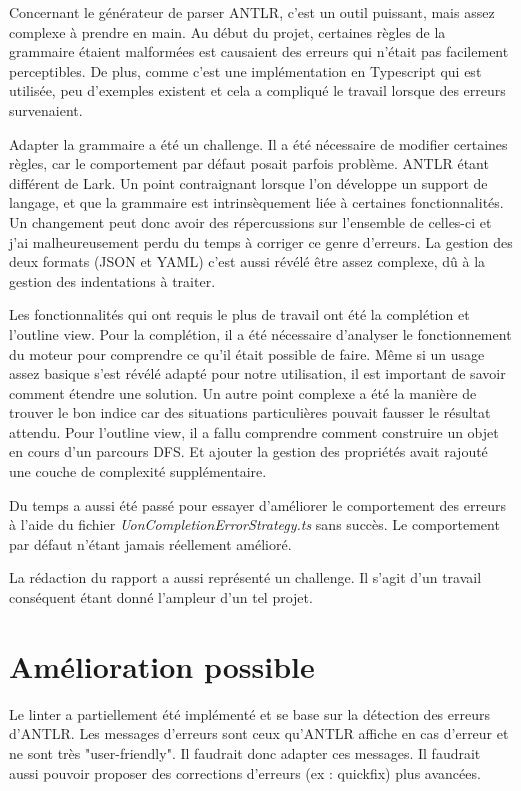 \documentclass[
    iict, %
    il, %
]{heig-tb}
\begin{document}
Concernant le générateur de parser ANTLR, c'est un outil puissant, mais assez complexe à prendre en main.
Au début du projet, certaines règles de la grammaire étaient malformées est causaient des erreurs qui n'était pas facilement perceptibles.
De plus, comme c'est une implémentation en Typescript qui est utilisée, peu d'exemples existent et cela a compliqué le travail lorsque des erreurs survenaient.

Adapter la grammaire a été un challenge. Il a été nécessaire de modifier certaines règles, car le comportement par défaut posait parfois problème. ANTLR étant différent de Lark.
Un point contraignant lorsque l'on développe un support de langage, et que la grammaire est intrinsèquement liée à certaines fonctionnalités.
Un changement peut donc avoir des répercussions sur l'ensemble de celles-ci et j'ai malheureusement perdu du temps à corriger ce genre d'erreurs.
La gestion des deux formats (JSON et YAML) c'est aussi révélé être assez complexe, dû à la gestion des indentations à traiter.

Les fonctionnalités qui ont requis le plus de travail ont été la complétion et l'outline view.
Pour la complétion, il a été nécessaire d'analyser le fonctionnement du moteur pour comprendre ce qu'il était possible de faire.
Même si un usage assez basique s'est révélé adapté pour notre utilisation, il est important de savoir comment étendre une solution.
Un autre point complexe a été la manière de trouver le bon indice car des situations particulières pouvait fausser le résultat attendu.
Pour l'outline view, il a fallu comprendre comment construire un objet en cours d'un parcours DFS. Et ajouter la gestion des propriétés avait rajouté une couche de complexité supplémentaire.

Du temps a aussi été passé pour essayer d'améliorer le comportement des erreurs à l'aide du fichier \emph{UonCompletionErrorStrategy.ts} sans succès. Le comportement par défaut n'étant jamais réellement amélioré.

La rédaction du rapport a aussi représenté un challenge. Il s'agit d'un travail conséquent étant donné l'ampleur d'un tel projet.

\section{Amélioration possible}

Le linter a partiellement été implémenté et se base sur la détection des erreurs d'ANTLR.
Les messages d'erreurs sont ceux qu'ANTLR affiche en cas d'erreur et ne sont très "user-friendly". Il faudrait donc adapter ces messages.
Il faudrait aussi pouvoir proposer des corrections d'erreurs (ex : quickfix) plus avancées.
\end{document}
